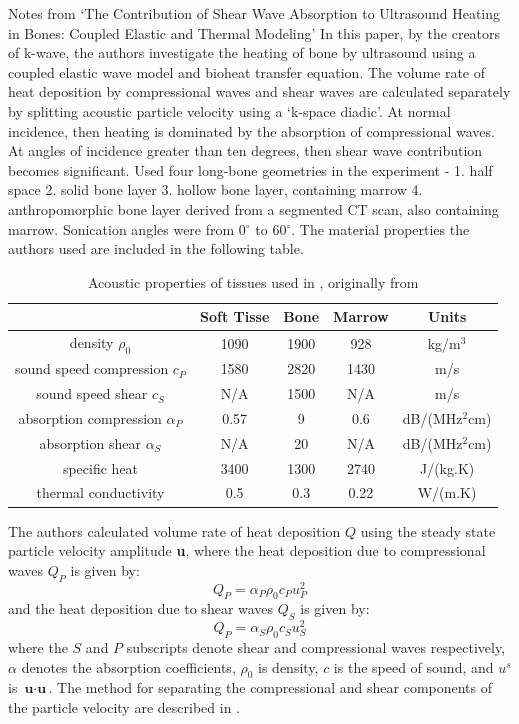 \documentclass[11pt,titlepage]{article} %
\begin{document}
Notes from `The Contribution of Shear Wave Absorption to Ultrasound Heating in Bones: Coupled Elastic and Thermal Modeling' \cite{treeby2015contribution}
In this paper, by the creators of k-wave, the authors investigate the heating of bone by ultrasound using a coupled elastic wave model and bioheat transfer equation. The volume rate of heat deposition by compressional waves and shear waves are calculated separately by splitting acoustic particle velocity using a `k-space diadic'. At normal incidence, then heating is dominated by the absorption of compressional waves. At angles of incidence greater than ten degrees, then shear wave contribution becomes significant.
Used four long-bone geometries in the experiment - 1. half space 2. solid bone layer 3. hollow bone layer, containing marrow 4. anthropomorphic bone layer derived from a segmented CT scan, also containing marrow. Sonication angles were from 0$^{\circ}$ to 60$^{\circ}$. The material properties the authors used are included in the following table. 
 \begin{table}[!h]
\begin{center}
  \begin{tabular}{| c | c | c | c | c | }
    \hline
     & Soft Tisse & Bone & Marrow & Units \\ \hline
     density $\rho_0$ & 1090 & 1900 & 928 & kg/m$^3$ \\ 
     sound speed compression $c_P$ & 1580 & 2820 & 1430 & m/s \\ 
     sound speed shear $c_S$ & N/A & 1500 & N/A & m/s \\ 
     absorption compression $\alpha_P$ & 0.57 & 9 & 0.6 & dB/(MHz$^2$cm) \\
     absorption shear $\alpha_S$ & N/A & 20 & N/A & dB/(MHz$^2$cm) \\
	 specific heat & 3400 & 1300 & 2740 & J/(kg.K)\\
	 thermal conductivity & 0.5 & 0.3 & 0.22 & W/(m.K)\\
    \hline
  \end{tabular}
\end{center}
\caption{Acoustic properties of tissues used in \cite{treeby2015contribution}, originally from \cite{duck1990physical}}
\end{table}
\linespread{1.0}
The authors calculated volume rate of heat deposition $Q$ using the steady state particle velocity amplitude \textbf{u}, where the heat deposition due to compressional waves $Q_P$ is given by:
\begin{equation}
Q_P = \alpha_P \rho_0 c_P u_P^2
\end{equation}
and the heat deposition due to shear waves $Q_S$ is given by:
\begin{equation}
Q_P = \alpha_S \rho_0 c_S u_S^2
\end{equation}
where the $S$ and $P$ subscripts denote shear and compressional waves respectively, $\alpha$ denotes the absorption coefficients, $\rho_0$ is density, $c$ is the speed of sound, and $u^s$ is $\textbf{u} \cdot \textbf{u}$. The method for separating the compressional and shear components of the particle velocity are described in \cite{treeby2014modeling}.

\newpage

{}

\end{document}
